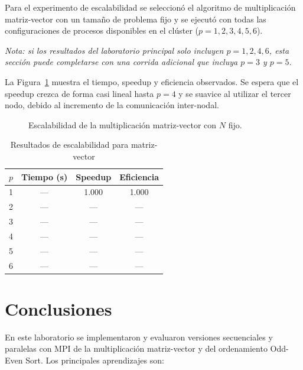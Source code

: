 \documentclass[12pt,a4paper]{article}
\begin{document}
Para el experimento de escalabilidad se seleccionó el algoritmo de multiplicación matriz-vector con un tamaño de problema fijo y se ejecutó con todas las configuraciones de procesos disponibles en el clúster ($p=1,2,3,4,5,6$).

\textit{Nota: si los resultados del laboratorio principal solo incluyen $p=1,2,4,6$, esta sección puede completarse con una corrida adicional que incluya $p=3$ y $p=5$.}

La Figura~\ref{fig:escalabilidad} muestra el tiempo, speedup y eficiencia observados. Se espera que el speedup crezca de forma casi lineal hasta $p=4$ y se suavice al utilizar el tercer nodo, debido al incremento de la comunicación inter-nodal.

\begin{figure}[htbp]
\centering
{}
\caption{Escalabilidad de la multiplicación matriz-vector con $N$ fijo.}
\label{fig:escalabilidad}
\end{figure}

\begin{table}[htbp]
\centering
\caption{Resultados de escalabilidad para matriz-vector}
\label{tab:escalabilidad}
\begin{tabular}{@{}cccc@{}}
\toprule
$p$ & Tiempo (s) & Speedup & Eficiencia \\
\midrule
1 & --- & 1.000 & 1.000 \\
2 & --- & --- & --- \\
3 & --- & --- & --- \\
4 & --- & --- & --- \\
5 & --- & --- & --- \\
6 & --- & --- & --- \\
\bottomrule
\end{tabular}
\end{table}

\section{Conclusiones}
\label{sec:conclusiones}

En este laboratorio se implementaron y evaluaron versiones secuenciales y paralelas con MPI de la multiplicación matriz-vector y del ordenamiento Odd-Even Sort. Los principales aprendizajes son:
\end{document}
